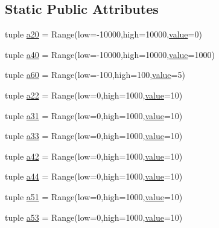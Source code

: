 \subsection*{Static Public Attributes}
\begin{DoxyCompactItemize}
\item 
tuple \hyperlink{classaberrations_1_1_ab3_a715ff78e10a0a75678493af40ff63ca1}{a20} = Range(low=-\/10000,high=10000,\hyperlink{read_config_file_8m_afcc7a4b78ecd8fa7e713f8cfa0f51017}{value}=0)
\item 
tuple \hyperlink{classaberrations_1_1_ab3_a4ce0fbb1fbe9365ea1e480a3866dbd51}{a40} = Range(low=-\/10000,high=10000,\hyperlink{read_config_file_8m_afcc7a4b78ecd8fa7e713f8cfa0f51017}{value}=1000)
\item 
tuple \hyperlink{classaberrations_1_1_ab3_a15533015c34cc472b96642dc6a87e17f}{a60} = Range(low=-\/100,high=100,\hyperlink{read_config_file_8m_afcc7a4b78ecd8fa7e713f8cfa0f51017}{value}=5)
\item 
tuple \hyperlink{classaberrations_1_1_ab3_a156045dd2125a70fb302763bbba3acc7}{a22} = Range(low=0,high=1000,\hyperlink{read_config_file_8m_afcc7a4b78ecd8fa7e713f8cfa0f51017}{value}=10)
\item 
tuple \hyperlink{classaberrations_1_1_ab3_a9441ccb42434e133bc7f04cd7545f91d}{a31} = Range(low=0,high=1000,\hyperlink{read_config_file_8m_afcc7a4b78ecd8fa7e713f8cfa0f51017}{value}=10)
\item 
tuple \hyperlink{classaberrations_1_1_ab3_a507a723cf8799c2851689827296a9658}{a33} = Range(low=0,high=1000,\hyperlink{read_config_file_8m_afcc7a4b78ecd8fa7e713f8cfa0f51017}{value}=10)
\item 
tuple \hyperlink{classaberrations_1_1_ab3_abda80a3fc204ebf86463a47c12934987}{a42} = Range(low=0,high=1000,\hyperlink{read_config_file_8m_afcc7a4b78ecd8fa7e713f8cfa0f51017}{value}=10)
\item 
tuple \hyperlink{classaberrations_1_1_ab3_acd01b2dcdb096fd7e5274d1393d58eec}{a44} = Range(low=0,high=1000,\hyperlink{read_config_file_8m_afcc7a4b78ecd8fa7e713f8cfa0f51017}{value}=10)
\item 
tuple \hyperlink{classaberrations_1_1_ab3_afe66278f105e9740c36aa3c3870e2820}{a51} = Range(low=0,high=1000,\hyperlink{read_config_file_8m_afcc7a4b78ecd8fa7e713f8cfa0f51017}{value}=10)
\item 
tuple \hyperlink{classaberrations_1_1_ab3_a98ddad2440f4a881b1f23b27be43e571}{a53} = Range(low=0,high=1000,\hyperlink{read_config_file_8m_afcc7a4b78ecd8fa7e713f8cfa0f51017}{value}=10)
\item 

\end{DoxyCompactItemize}
